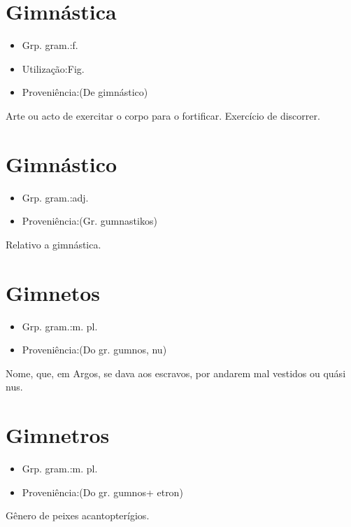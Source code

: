 \section{Gimnástica}
\begin{itemize}
\item {Grp. gram.:f.}
\end{itemize}
\begin{itemize}
\item {Utilização:Fig.}
\end{itemize}
\begin{itemize}
\item {Proveniência:(De \textunderscore gimnástico\textunderscore )}
\end{itemize}
Arte ou acto de exercitar o corpo para o fortificar.
Exercício de discorrer.
\section{Gimnástico}
\begin{itemize}
\item {Grp. gram.:adj.}
\end{itemize}
\begin{itemize}
\item {Proveniência:(Gr. \textunderscore gumnastikos\textunderscore )}
\end{itemize}
Relativo a gimnástica.
\section{Gimnetos}
\begin{itemize}
\item {Grp. gram.:m. pl.}
\end{itemize}
\begin{itemize}
\item {Proveniência:(Do gr. \textunderscore gumnos\textunderscore , nu)}
\end{itemize}
Nome, que, em Argos, se dava aos escravos, por andarem mal vestidos ou quási nus.
\section{Gimnetros}
\begin{itemize}
\item {Grp. gram.:m. pl.}
\end{itemize}
\begin{itemize}
\item {Proveniência:(Do gr. \textunderscore gumnos\textunderscore  + \textunderscore etron\textunderscore )}
\end{itemize}
Gênero de peixes acantopterígios.

